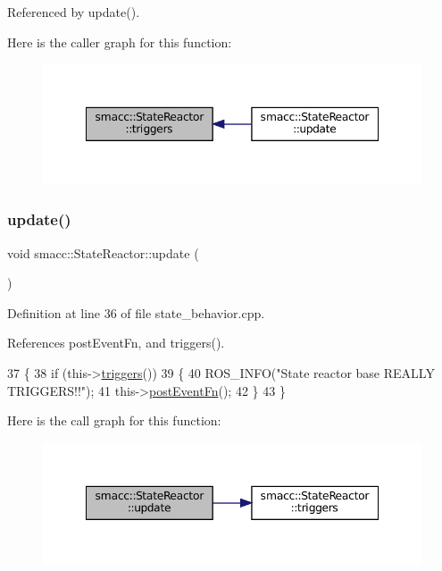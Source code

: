 Referenced by update().

Here is the caller graph for this function\+:
\nopagebreak
\begin{figure}[H]
\begin{center}
\leavevmode
\includegraphics[width=348pt]{classsmacc_1_1StateReactor_a445bc3c90980d75d7d815b85cfb68b21_icgraph}
\end{center}
\end{figure}
\mbox{\label{classsmacc_1_1StateReactor_aca5d4f7af06532272db55943b7810a43}} 
\subsubsection{\texorpdfstring{update()}{update()}}
{\footnotesize\ttfamily void smacc\+::\+State\+Reactor\+::update (\begin{DoxyParamCaption}{ }\end{DoxyParamCaption})}



Definition at line 36 of file state\+\_\+behavior.\+cpp.



References post\+Event\+Fn, and triggers().


\begin{DoxyCode}
37 \{
38     \textcolor{keywordflow}{if} (this->\hyperlink{classsmacc_1_1StateReactor_a445bc3c90980d75d7d815b85cfb68b21}{triggers}())
39     \{
40         ROS\_INFO(\textcolor{stringliteral}{"State reactor base REALLY TRIGGERS!!"});
41         this->\hyperlink{classsmacc_1_1StateReactor_a1d97ae5c1689b6716c60c19c94a7eeae}{postEventFn}();
42     \}
43 \}
\end{DoxyCode}
Here is the call graph for this function\+:
\nopagebreak
\begin{figure}[H]
\begin{center}
\leavevmode
\includegraphics[width=348pt]{classsmacc_1_1StateReactor_aca5d4f7af06532272db55943b7810a43_cgraph}
\end{center}
\end{figure}


